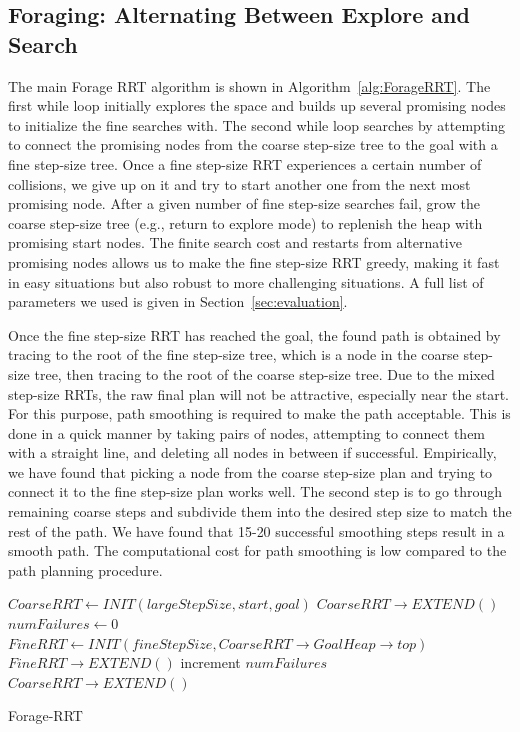 \documentclass[conference]{IEEEtran}
\begin{document}
\subsection{Foraging: Alternating Between Explore and Search}
The main Forage RRT algorithm is shown in Algorithm~\ref{alg:ForageRRT}. The
first while loop initially explores the space and builds up several promising 
nodes to initialize the fine searches with. The second while loop searches
by attempting to connect the promising nodes from the coarse step-size tree
to the goal with a fine step-size tree. Once a fine step-size RRT
experiences a certain number of collisions, we give up on it and try to
start another one from the next most promising node. After a given number of
fine step-size searches fail, grow the coarse step-size tree (e.g.,
return to explore mode) to replenish the heap with promising start nodes.
The finite search cost and restarts from alternative promising nodes allows
us to make the fine step-size RRT greedy, making it fast in easy situations
but also robust to more challenging situations. A full list of parameters we
used is given in Section~\ref{sec:evaluation}.

Once the fine step-size RRT has reached the goal, the found path is obtained
by tracing to the root of the fine step-size tree, which is a node in the
coarse step-size tree, then tracing to the root of the coarse step-size tree.
Due to the mixed step-size RRTs, the raw final plan will not be attractive, 
especially near the start. For this purpose, path smoothing is required to 
make the path acceptable. This is done in a quick manner by taking pairs of
nodes, attempting to connect them with a straight line, and deleting all
nodes in between if successful. Empirically, we have found that
picking a node from the coarse step-size plan and trying to connect it to 
the fine step-size plan works well.  The second step is to go through
remaining coarse steps and subdivide them into the desired step size to
match the rest of the path.  We have found that 15-20 successful smoothing 
steps result in a smooth path.  The computational cost for path smoothing is
low compared to the path planning procedure.

\begin{algorithm}
  \label{alg:ForageRRT}
  \SetAlgoLined
  $CoarseRRT \leftarrow INIT(largeStepSize, start, goal)$\;
   {
	$CoarseRRT \rightarrow EXTEND()$\;
   }
   {
    $numFailures \leftarrow 0$\;
	$FineRRT \leftarrow INIT(fineStepSize, 
	                         CoarseRRT \rightarrow GoalHeap \rightarrow top)$\;
	 {
	  $FineRRT \rightarrow EXTEND()$\;
	 }
	increment $numFailures$ \;
	 {
	   {
		$CoarseRRT \rightarrow EXTEND()$\;
	   }
	 }
   }
  \caption{Forage-RRT}
\end{algorithm}
\end{document}
